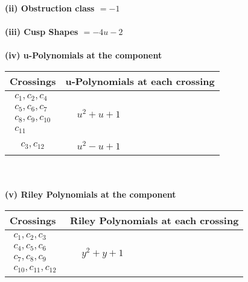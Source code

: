 \documentclass[1p]{elsarticle_modified}
\theoremstyle{definition}
\begin{document}
\flushleft \textbf{(ii) Obstruction class $= -1$}\\~\\
\flushleft \textbf{(iii) Cusp Shapes $= -4 u-2$}\\~\\
\newpage\renewcommand{\arraystretch}{1}
\flushleft \textbf{(iv) u-Polynomials at the component}\newline \\
\begin{tabular}{m{50pt}|m{274pt}}
Crossings & \hspace{64pt}u-Polynomials at each crossing \\
\hline $$\begin{aligned}c_{1},c_{2},c_{4}\\c_{5},c_{6},c_{7}\\c_{8},c_{9},c_{10}\\c_{11}\end{aligned}$$&$\begin{aligned}
&u^2+u+1
\end{aligned}$\\
\hline $$\begin{aligned}c_{3},c_{12}\end{aligned}$$&$\begin{aligned}
&u^2- u+1
\end{aligned}$\\
\hline
\end{tabular}\\~\\
\newpage\renewcommand{\arraystretch}{1}
\flushleft \textbf{(v) Riley Polynomials at the component}\newline \\
\begin{tabular}{m{50pt}|m{274pt}}
Crossings & \hspace{64pt}Riley Polynomials at each crossing \\
\hline $$\begin{aligned}c_{1},c_{2},c_{3}\\c_{4},c_{5},c_{6}\\c_{7},c_{8},c_{9}\\c_{10},c_{11},c_{12}\end{aligned}$$&$\begin{aligned}
&y^2+y+1
\end{aligned}$\\
\hline
\end{tabular}\\~\\
\end{document}
